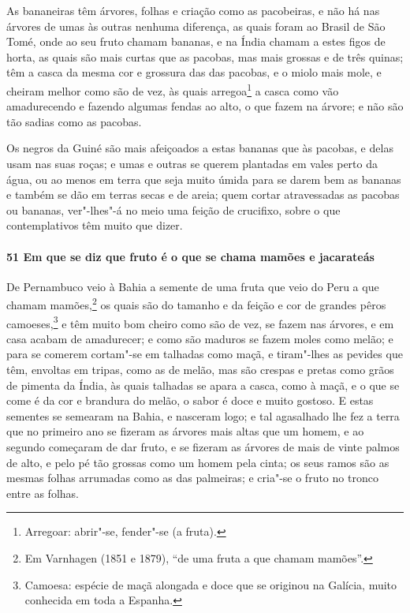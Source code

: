 As bananeiras têm árvores, folhas e criação como as pacobeiras, e não há nas árvores de
umas às outras nenhuma diferença, as quais foram ao Brasil de São Tomé, onde ao seu fruto
chamam bananas, e na Índia chamam a estes figos de horta, as quais são mais curtas que as
pacobas, mas mais grossas e de três quinas; têm a casca da mesma cor e grossura das das
pacobas, e o miolo mais mole, e cheiram melhor como são de vez, às quais arregoa\footnote{
Arregoar: abrir"-se, fender"-se (a fruta).} a casca como vão amadurecendo e fazendo algumas
fendas ao alto, o que fazem na árvore; e não são tão sadias como as pacobas.

Os negros da Guiné são mais afeiçoados a estas bananas que às pacobas, e delas usam nas
suas roças; e umas e outras se querem plantadas em vales perto da água, ou ao menos em
terra que seja muito úmida para se darem bem as bananas e também se dão em terras secas e
de areia; quem cortar atravessadas as pacobas ou bananas, ver"-lhes"-á no meio uma feição de
crucifixo, sobre o que contemplativos têm muito que dizer.

\paragraph{51 Em que se diz que fruto é o que se chama mamões e jacarateás}

De Pernambuco veio à Bahia a semente de uma fruta que veio do Peru a que chamam
mamões,\footnote{ Em Varnhagen (1851 e 1879), ``de uma fruta a que chamam mamões''.} os
quais são do tamanho e da feição e cor de grandes pêros camoeses,\footnote{ Camoesa:
espécie de maçã alongada e doce que se originou na Galícia, muito conhecida em toda a
Espanha.} e têm muito bom cheiro como são de vez, se fazem nas árvores, e em casa acabam
de amadurecer; e como são maduros se fazem moles como melão; e para se comerem cortam"-se
em talhadas como maçã, e tiram"-lhes as pevides que têm, envoltas em tripas, como as de
melão, mas são crespas e pretas como grãos de pimenta da Índia, às quais talhadas se apara
a casca, como à maçã, e o que se come é da cor e brandura do melão, o sabor é doce e muito
gostoso. E estas sementes se semearam na Bahia, e nasceram logo; e tal agasalhado lhe fez
a terra que no primeiro ano se fizeram as árvores mais altas que um homem, e ao segundo
começaram de dar fruto, e se fizeram as árvores de mais de vinte palmos de alto, e pelo pé
tão grossas como um homem pela cinta; os seus ramos são as mesmas folhas arrumadas como as
das palmeiras; e cria"-se o fruto no tronco entre as folhas.

